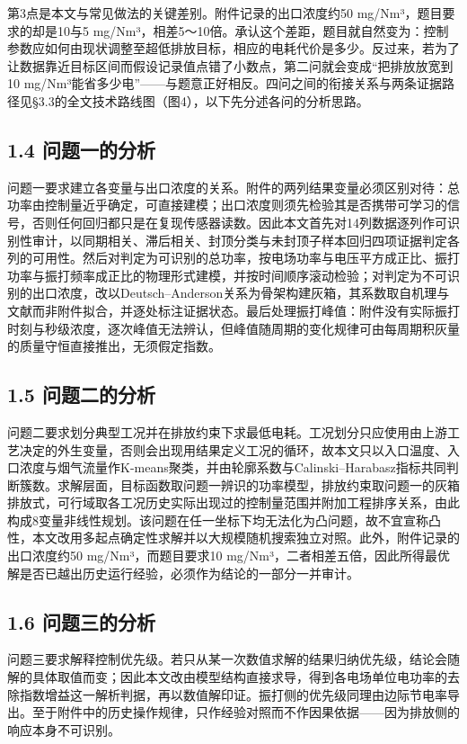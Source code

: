 \documentclass[UTF8,zihao=5,a4paper]{ctexart}
\begin{document}
第3点是本文与常见做法的关键差别。附件记录的出口浓度约50 mg/Nm³，题目要求的却是10与5 mg/Nm³，相差5～10倍。承认这个差距，题目就自然变为：控制参数应如何由现状调整至超低排放目标，相应的电耗代价是多少。反过来，若为了让数据靠近目标区间而假设记录值点错了小数点，第二问就会变成“把排放放宽到10 mg/Nm³能省多少电”——与题意正好相反。四问之间的衔接关系与两条证据路径见§3.3的全文技术路线图（图4），以下先分述各问的分析思路。

\subsection*{1.4 问题一的分析}

问题一要求建立各变量与出口浓度的关系。附件的两列结果变量必须区别对待：总功率由控制量近乎确定，可直接建模；出口浓度则须先检验其是否携带可学习的信号，否则任何回归都只是在复现传感器读数。因此本文首先对14列数据逐列作可识别性审计，以同期相关、滞后相关、封顶分类与未封顶子样本回归四项证据判定各列的可用性。然后对判定为可识别的总功率，按电场功率与电压平方成正比、振打功率与振打频率成正比的物理形式建模，并按时间顺序滚动检验；对判定为不可识别的出口浓度，改以Deutsch–Anderson关系为骨架构建灰箱，其系数取自机理与文献而非附件拟合，并逐处标注证据状态。最后处理振打峰值：附件没有实际振打时刻与秒级浓度，逐次峰值无法辨认，但峰值随周期的变化规律可由每周期积灰量的质量守恒直接推出，无须假定指数。

\subsection*{1.5 问题二的分析}

问题二要求划分典型工况并在排放约束下求最低电耗。工况划分只应使用由上游工艺决定的外生变量，否则会出现用结果定义工况的循环，故本文只以入口温度、入口浓度与烟气流量作K-means聚类，并由轮廓系数与Calinski–Harabasz指标共同判断簇数。求解层面，目标函数取问题一辨识的功率模型，排放约束取问题一的灰箱排放式，可行域取各工况历史实际出现过的控制量范围并附加工程排序关系，由此构成8变量非线性规划。该问题在任一坐标下均无法化为凸问题，故不宜宣称凸性，本文改用多起点确定性求解并以大规模随机搜索独立对照。此外，附件记录的出口浓度约50 mg/Nm³，而题目要求10 mg/Nm³，二者相差五倍，因此所得最优解是否已越出历史运行经验，必须作为结论的一部分一并审计。

\subsection*{1.6 问题三的分析}

问题三要求解释控制优先级。若只从某一次数值求解的结果归纳优先级，结论会随解的具体取值而变；因此本文改由模型结构直接求导，得到各电场单位电功率的去除指数增益这一解析判据，再以数值解印证。振打侧的优先级同理由边际节电率导出。至于附件中的历史操作规律，只作经验对照而不作因果依据——因为排放侧的响应本身不可识别。
\end{document}
